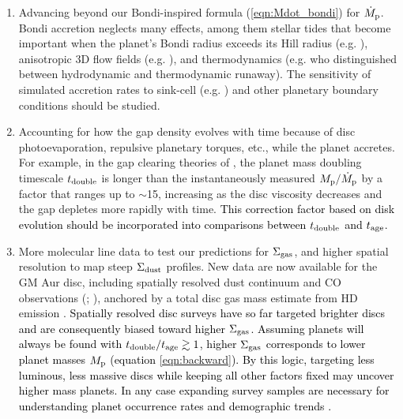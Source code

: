 \documentclass[fleqn,usenatbib]{mnras}
\newcommand{\nick}[1]{\textcolor{black}{ #1}}
\newcommand{\Sigg}{\Sigma_{\rm gas}}
\newcommand{\Sigd}{\Sigma_{\rm dust}}
\begin{document}
  \begin{enumerate}
   \item Advancing beyond our Bondi-inspired formula (\ref{eqn:Mdot_bondi}) for $\dot{M}_{\rm p}$. Bondi accretion neglects
many effects, among them stellar tides that become important when the planet's Bondi radius exceeds its Hill radius (e.g. \citealt{rosenthal_etal_2020}), anisotropic 3D flow fields (e.g. \citealt{cimerman_etal_2017}), and 
thermodynamics (e.g. \citealt{ginzburg_chiang_2019a} who distinguished between hydrodynamic and thermodynamic runaway). The sensitivity of simulated accretion rates to sink-cell (e.g. \citealt{dangelo_etal_2003}) and other planetary boundary conditions should be studied.

\item Accounting for how the gap density evolves with time because of disc photoevaporation, repulsive planetary torques, etc., while the planet accretes. For example, in the gap clearing theories of \citet{ginzburg_chiang_2019a}, the planet mass doubling timescale $t_{\rm double}$ 
is longer than the instantaneously measured $M_{\rm p}/\dot{M}_{\rm p}$ by a factor that ranges up to $\sim$15, increasing as the disc viscosity decreases and the gap depletes more rapidly with time. \nick{This correction factor based on disk evolution should be incorporated into comparisons between $t_{\rm double}$ and $t_{\rm age}$.}

\item More molecular line data to test our predictions for $\Sigg$, and higher spatial resolution to map steep $\Sigd$ profiles. New data are now available for the GM Aur disc, including spatially resolved dust continuum and CO observations (\citealt{huang_etal_2020, huang_etal_2021}; \citealt{schwarz_etal_2021}), anchored by a total disc gas mass estimate from HD emission \citep{mcclure_etal_2016}. \nick{Spatially resolved disc surveys have so far targeted brighter discs \citep{andrews_etal_2018, oberg_etal_2021} and are consequently biased toward higher $\Sigg$.
Assuming planets will always
be found with $t_{\rm double}/t_{\rm age} \gtrsim 1$, higher $\Sigg$ corresponds to lower planet masses $M_{\rm p}$ (equation \ref{eqn:backward}). 
By this logic, targeting less luminous, less massive discs while keeping all other factors fixed  may uncover higher mass planets. In any case expanding survey samples are necessary for understanding planet occurrence rates and demographic trends \citep{cieza_etal_2019}.}


\end{enumerate}
\end{document}
